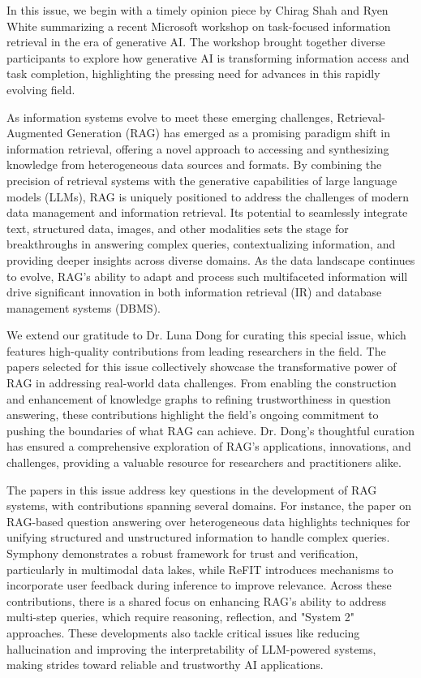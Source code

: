 \documentclass[11pt]{article}
\begin{document}
In this issue, we begin with a timely opinion piece by Chirag Shah and Ryen White summarizing a recent Microsoft workshop on task-focused information retrieval in the era of generative AI. The workshop brought together diverse participants to explore how generative AI is transforming information access and task completion, highlighting the pressing need for advances in this rapidly evolving field.

As information systems evolve to meet these emerging challenges, Retrieval-Augmented Generation (RAG) has emerged as a promising paradigm shift in information retrieval, offering a novel approach to accessing and synthesizing knowledge from heterogeneous data sources and formats. By combining the precision of retrieval systems with the generative capabilities of large language models (LLMs), RAG is uniquely positioned to address the challenges of modern data management and information retrieval. Its potential to seamlessly integrate text, structured data, images, and other modalities sets the stage for breakthroughs in answering complex queries, contextualizing information, and providing deeper insights across diverse domains. As the data landscape continues to evolve, RAG's ability to adapt and process such multifaceted information will drive significant innovation in both information retrieval (IR) and database management systems (DBMS).

We extend our gratitude to Dr. Luna Dong for curating this special issue, which features high-quality contributions from leading researchers in the field. The papers selected for this issue collectively showcase the transformative power of RAG in addressing real-world data challenges. From enabling the construction and enhancement of knowledge graphs to refining trustworthiness in question answering, these contributions highlight the field's ongoing commitment to pushing the boundaries of what RAG can achieve. Dr. Dong's thoughtful curation has ensured a comprehensive exploration of RAG's applications, innovations, and challenges, providing a valuable resource for researchers and practitioners alike.

The papers in this issue address key questions in the development of RAG systems, with contributions spanning several domains. For instance, the paper on RAG-based question answering over heterogeneous data highlights techniques for unifying structured and unstructured information to handle complex queries. Symphony demonstrates a robust framework for trust and verification, particularly in multimodal data lakes, while ReFIT introduces mechanisms to incorporate user feedback during inference to improve relevance. Across these contributions, there is a shared focus on enhancing RAG's ability to address multi-step queries, which require reasoning, reflection, and "System 2" approaches. These developments also tackle critical issues like reducing hallucination and improving the interpretability of LLM-powered systems, making strides toward reliable and trustworthy AI applications.
\end{document}
